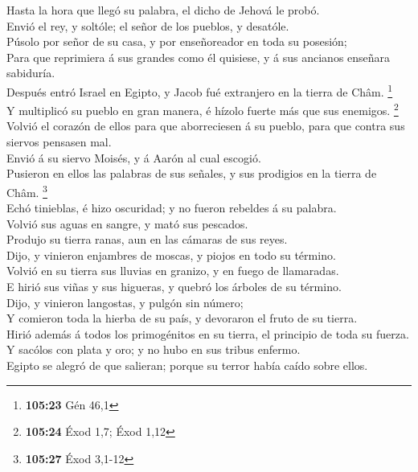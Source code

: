  Hasta la hora que llegó su palabra, el dicho de Jehová le
probó.\\
 Envió el rey, y soltóle; el señor de los pueblos, y
desatóle.\\
 Púsolo por señor de su casa, y por enseñoreador en toda su
posesión;\\
 Para que reprimiera á sus grandes como él quisiese, y á
sus ancianos enseñara sabiduría.\\
 Después entró Israel en Egipto, y Jacob fué extranjero en
la tierra de Châm. \footnote{\textbf{105:23} Gén 46,1}\\
 Y multiplicó su pueblo en gran manera, é hízolo fuerte más
que sus enemigos. \footnote{\textbf{105:24} Éxod 1,7; Éxod 1,12}\\
 Volvió el corazón de ellos para que aborreciesen á su
pueblo, para que contra sus siervos pensasen mal.\\
 Envió á su siervo Moisés, y á Aarón al cual escogió.\\
 Pusieron en ellos las palabras de sus señales, y sus
prodigios en la tierra de Châm. \footnote{\textbf{105:27} Éxod 3,1-12}\\
 Echó tinieblas, é hizo oscuridad; y no fueron rebeldes á
su palabra.\\
 Volvió sus aguas en sangre, y mató sus pescados.\\
 Produjo su tierra ranas, aun en las cámaras de sus
reyes.\\
 Dijo, y vinieron enjambres de moscas, y piojos en todo su
término.\\
 Volvió en su tierra sus lluvias en granizo, y en fuego de
llamaradas.\\
 E hirió sus viñas y sus higueras, y quebró los árboles de
su término.\\
 Dijo, y vinieron langostas, y pulgón sin número;\\
 Y comieron toda la hierba de su país, y devoraron el fruto
de su tierra.\\
 Hirió además á todos los primogénitos en su tierra, el
principio de toda su fuerza.\\
 Y sacólos con plata y oro; y no hubo en sus tribus
enfermo.\\
 Egipto se alegró de que salieran; porque su terror había
caído sobre ellos.\\
